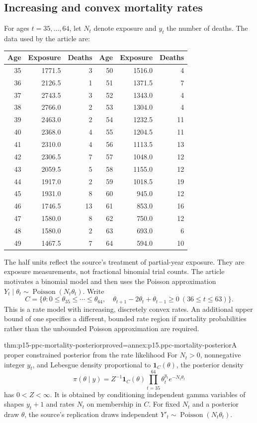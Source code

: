 \subsection{Increasing and convex mortality rates}
For ages \(t=35,\ldots,64\), let \(N_t\) denote exposure and \(y_t\)
the number of deaths. The data used by the article are:
\begin{center}\small
\begin{tabular}{rrr@{\qquad}rrr}
\hline
Age & Exposure & Deaths & Age & Exposure & Deaths\\\hline
35&1771.5&3&50&1516.0&4\\
36&2126.5&1&51&1371.5&7\\
37&2743.5&3&52&1343.0&4\\
38&2766.0&2&53&1304.0&4\\
39&2463.0&2&54&1232.5&11\\
40&2368.0&4&55&1204.5&11\\
41&2310.0&4&56&1113.5&13\\
42&2306.5&7&57&1048.0&12\\
43&2059.5&5&58&1155.0&12\\
44&1917.0&2&59&1018.5&19\\
45&1931.0&8&60&945.0&12\\
46&1746.5&13&61&853.0&16\\
47&1580.0&8&62&750.0&12\\
48&1580.0&2&63&693.0&6\\
49&1467.5&7&64&594.0&10\\\hline
\end{tabular}
\end{center}
The half units reflect the source's treatment of partial-year exposure.
They are exposure measurements, not fractional binomial trial counts.
The article motivates a binomial model and then uses the Poisson
approximation \(Y_t\mid\theta_t\sim\operatorname{Poisson}(N_t\theta_t)\).
Write
\[
 C=\{\theta:0\leq\theta_{35}\leq\cdots\leq\theta_{64},\quad
 \theta_{t+1}-2\theta_t+\theta_{t-1}\geq0\ (36\leq t\leq63)\}.
\]
This is a rate model with increasing, discretely convex rates. An additional
upper bound of one specifies a different, bounded rate region if mortality
probabilities rather than the unbounded Poisson approximation are required.

\begin{hbtheorem}{thm:p15-ppc-mortality-posterior}{proved=annex:p15.ppc-mortality-posterior}{A proper constrained posterior from the rate likelihood}
For \(N_t>0\), nonnegative integer \(y_t\), and Lebesgue density
proportional to \(\mathbf1_C(\theta)\), the posterior density
\[
 \pi(\theta\mid y)=Z^{-1}\mathbf1_C(\theta)
      \prod_{t=35}^{64}\theta_t^{y_t}e^{-N_t\theta_t}
\]
has \(0<Z<\infty\). It is obtained by conditioning independent gamma
variables of shapes \(y_t+1\) and rates \(N_t\) on membership in \(C\).
For fixed \(N_t\) and a posterior draw \(\theta\), the source's
replication draws independent \(Y'_t\sim\operatorname{Poisson}(N_t\theta_t)\).
\end{hbtheorem}

